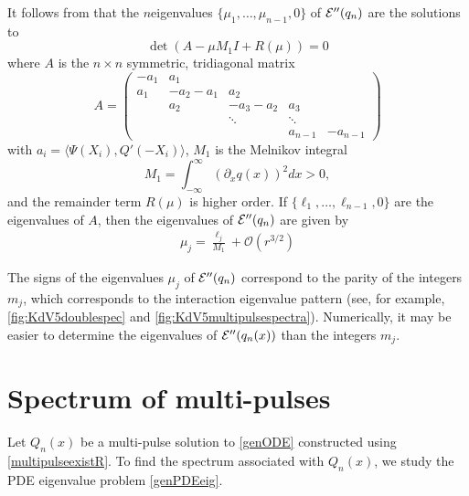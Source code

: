 \documentclass[thesis.tex]{subfiles}
\begin{document}
\begin{remark}\label{remark:Hessianeigs}
It follows from \cite{Sandstede1998} that the $n$eigenvalues $\{ \mu_1, \dots, \mu_{n-1}, 0 \}$ of $\mathcal{E}''(q_n)$ are the solutions to 
\[
\det(A - \mu M_1 I + R(\mu)) = 0
\]
where $A$ is the $n \times n$ symmetric, tridiagonal matrix
\begin{equation}\label{nhomA}
A = \begin{pmatrix}
-a_1 & a_1 \\
a_1 & -a_2 - a_1 & a_2 \\
& a_2 & -a_3 - a_2 & a_3 \\
&& \ddots & \ddots \\
& & & a_{n-1} & -a_{n-1} 
\end{pmatrix}
\end{equation}
with $a_i = \langle \Psi(X_i), Q'(-X_i) \rangle$, $M_1$ is the Melnikov integral
\begin{equation}
M_1 = \int_{-\infty}^\infty \left( \partial_x q(x) \right)^2 dx > 0,
\end{equation}\label{nhomM1}
and the remainder term $R(\mu)$ is higher order. If $\{\ell_1, \dots, \ell_{n-1}, 0\}$ are the eigenvalues of $A$, then the eigenvalues of $\mathcal{E}''(q_n)$ are given by
\begin{align*}
\mu_j = \frac{\ell_j}{M_1} + \mathcal{O}(r^{3/2})
\end{align*}
\end{remark}

\begin{remark}
The signs of the eigenvalues $\mu_j$ of $\mathcal{E}''(q_n)$ correspond to the parity of the integers $m_j$, which corresponds to the interaction eigenvalue pattern (see, for example, \cref{fig:KdV5doublespec} and \cref{fig:KdV5multipulsespectra}). Numerically, it may be easier to determine the eigenvalues of $\mathcal{E}''(q_n(x))$ than the integers $m_j$.
\end{remark}

\section{Spectrum of multi-pulses}\label{sec:multispecR}

Let $Q_n(x)$ be a multi-pulse solution to \cref{genODE} constructed using \cref{multipulseexistR}. To find the spectrum associated with $Q_n(x)$, we study the PDE eigenvalue problem \cref{genPDEeig}. 
\end{document}
